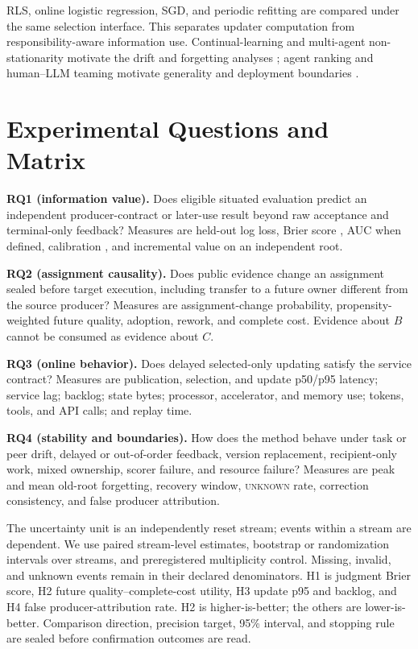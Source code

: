 \documentclass[sigconf,anonymous]{aamas}
\newcommand{\unknown}{\textsc{unknown}}
\begin{document}
RLS, online logistic regression, SGD, and periodic refitting are compared under the same selection interface. This separates updater computation from responsibility-aware information use. Continual-learning and multi-agent non-stationarity motivate the drift and forgetting analyses \cite{khetarpal2022continual,hernandezleal2017nonstationarity}; agent ranking and human--LLM teaming motivate generality and deployment boundaries \cite{lanctot2025soft,yurrita2026guidelines}.

\section{Experimental Questions and Matrix}
\textbf{RQ1 (information value).} Does eligible situated evaluation predict an independent producer-contract or later-use result beyond raw acceptance and terminal-only feedback? Measures are held-out log loss, Brier score \cite{brier1950verification}, AUC when defined, calibration \cite{guo2017calibration}, and incremental value on an independent root.

\textbf{RQ2 (assignment causality).} Does public evidence change an assignment sealed before target execution, including transfer to a future owner different from the source producer? Measures are assignment-change probability, propensity-weighted future quality, adoption, rework, and complete cost. Evidence about $B$ cannot be consumed as evidence about $C$.

\textbf{RQ3 (online behavior).} Does delayed selected-only updating satisfy the service contract? Measures are publication, selection, and update p50/p95 latency; service lag; backlog; state bytes; processor, accelerator, and memory use; tokens, tools, and API calls; and replay time.

\textbf{RQ4 (stability and boundaries).} How does the method behave under task or peer drift, delayed or out-of-order feedback, version replacement, recipient-only work, mixed ownership, scorer failure, and resource failure? Measures are peak and mean old-root forgetting, recovery window, \unknown{} rate, correction consistency, and false producer attribution.

The uncertainty unit is an independently reset stream; events within a stream are dependent. We use paired stream-level estimates, bootstrap or randomization intervals over streams, and preregistered multiplicity control. Missing, invalid, and unknown events remain in their declared denominators. H1 is judgment Brier score, H2 future quality--complete-cost utility, H3 update p95 and backlog, and H4 false producer-attribution rate. H2 is higher-is-better; the others are lower-is-better. Comparison direction, precision target, 95\% interval, and stopping rule are sealed before confirmation outcomes are read.
\end{document}
